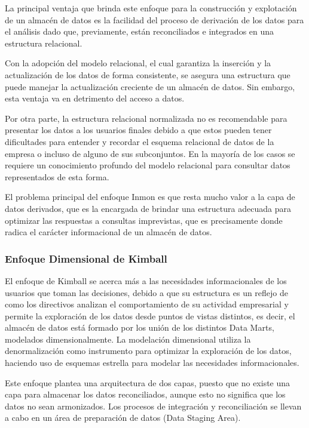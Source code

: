 La principal ventaja que brinda este enfoque para la construcci\'on y explotaci\'on de un almacén de datos es la facilidad del proceso 
de derivaci\'on de los datos para el análisis dado que, previamente, est\'an reconciliados e integrados en una estructura relacional.

Con la adopci\'on del modelo relacional, el cual garantiza la inserci\'on y la actualización de los datos de forma consistente, se 
asegura una estructura que puede manejar la actualización creciente de un almacén de datos. Sin embargo, esta ventaja va en 
detrimento del acceso a datos. 

Por otra parte, la estructura relacional normalizada no es recomendable para presentar los datos a los usuarios finales debido 
a que estos pueden tener dificultades para entender y recordar el esquema relacional de datos de la empresa o incluso de alguno 
de sus subconjuntos. En la mayor\'ia de los casos se requiere un conocimiento profundo del modelo relacional para consultar 
datos representados de esta forma. 

El problema principal del enfoque Inmon es que resta mucho valor a la capa de datos derivados, que es la encargada de brindar 
una estructura adecuada para optimizar las respuestas a consultas imprevistas, que es precisamente donde radica el car\'acter 
informacional de un almacén de datos.

\subsubsection{Enfoque Dimensional de Kimball}

El enfoque de Kimball se acerca m\'as a las necesidades informacionales de los usuarios que toman las decisiones, debido a que su 
estructura es un reflejo de como los directivos analizan el comportamiento de su actividad empresarial y permite la exploraci\'on 
de los datos desde puntos de vistas distintos\cite{kimball2011data}, es decir, el almacén de datos est\'a formado por 
los uni\'on de los distintos Data Marts, modelados dimensionalmente. La modelación dimensional utiliza la denormalizaci\'on como 
instrumento para optimizar la exploraci\'on de los datos, haciendo uso de esquemas estrella para modelar las necesidades informacionales.

Este enfoque plantea una arquitectura de dos capas, puesto que no existe una capa para almacenar los datos reconciliados, aunque 
esto no significa que los datos no sean armonizados. Los procesos de integración y reconciliación se llevan a cabo en un \'area 
de preparaci\'on de datos (Data Staging Area). 

